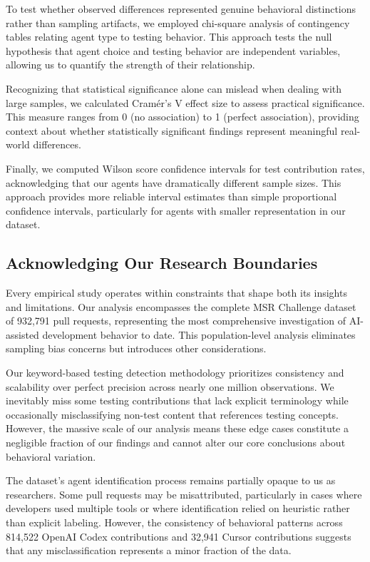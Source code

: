 \documentclass[conference]{IEEEtran}
\begin{document}
To test whether observed differences represented genuine behavioral distinctions rather than sampling artifacts, we employed chi-square analysis of contingency tables relating agent type to testing behavior. This approach tests the null hypothesis that agent choice and testing behavior are independent variables, allowing us to quantify the strength of their relationship.

Recognizing that statistical significance alone can mislead when dealing with large samples, we calculated Cramér's V effect size to assess practical significance. This measure ranges from 0 (no association) to 1 (perfect association), providing context about whether statistically significant findings represent meaningful real-world differences.

Finally, we computed Wilson score confidence intervals for test contribution rates, acknowledging that our agents have dramatically different sample sizes. This approach provides more reliable interval estimates than simple proportional confidence intervals, particularly for agents with smaller representation in our dataset.

\subsection{Acknowledging Our Research Boundaries}

Every empirical study operates within constraints that shape both its insights and limitations. Our analysis encompasses the complete MSR Challenge dataset of 932,791 pull requests, representing the most comprehensive investigation of AI-assisted development behavior to date. This population-level analysis eliminates sampling bias concerns but introduces other considerations.

Our keyword-based testing detection methodology prioritizes consistency and scalability over perfect precision across nearly one million observations. We inevitably miss some testing contributions that lack explicit terminology while occasionally misclassifying non-test content that references testing concepts. However, the massive scale of our analysis means these edge cases constitute a negligible fraction of our findings and cannot alter our core conclusions about behavioral variation.

The dataset's agent identification process remains partially opaque to us as researchers. Some pull requests may be misattributed, particularly in cases where developers used multiple tools or where identification relied on heuristic rather than explicit labeling. However, the consistency of behavioral patterns across 814,522 OpenAI Codex contributions and 32,941 Cursor contributions suggests that any misclassification represents a minor fraction of the data.
\end{document}
